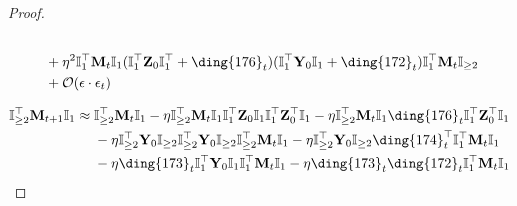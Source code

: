 \documentclass{article}
\theoremstyle{plain}
\theoremstyle{remark}
\def\O{\mathcal{O}}
\def\bY{\mathbf{Y}}
\def\bZ{\mathbf{Z}}
\newcommand{\cc}[1]{\text{\ding{\number\numexpr#1 + 171\relax}}}
\begin{document}
\begin{proof}
\begin{align*}
        \\
        &~~~~
            + \eta^2 \mathbb{I}_{1}^\top\mathbf{M}_{t}\mathbb{I}_{1}
            (\mathbb{I}_{1}^\top\bZ_0\mathbb{I}_1^\top+\cc{5}_t)
            (\mathbb{I}_{1}^\top\bY_0\mathbb{I}_{1}+\cc{1}_t)\mathbb{I}_1^\top\mathbf{M}_{t}\mathbb{I}_{\ge 2}
        \\
        &~~~~
        +\O(\epsilon\cdot\epsilon_t)
    \end{align*}

    \begin{align*}
        \mathbb{I}_{\ge2}^\top\mathbf{M}_{t+1} \mathbb{I}_{1}
        &\approx
            \mathbb{I}_{\ge2}^\top\mathbf{M}_{t}\mathbb{I}_{1}
            - \eta\mathbb{I}_{\ge2}^\top \mathbf{M}_{t}\mathbb{I}_{1}\mathbb{I}_{1}^\top\bZ_0\mathbb{I}_{1}\mathbb{I}_{1}^\top \bZ_0^\top\mathbb{I}_{1} 
            - \eta\mathbb{I}_{\ge2}^\top \mathbf{M}_{t}\mathbb{I}_{1}\cc{5}_t\mathbb{I}_{1}^\top \bZ_0^\top\mathbb{I}_{1} 
        \\
        &~~~~ 
            - \eta \mathbb{I}_{\ge2}^\top \bY_0 \mathbb{I}_{\ge2}\mathbb{I}_{\ge2}^\top \bY_0\mathbb{I}_{\ge 2}\mathbb{I}_{\ge 2}^\top\mathbf{M}_{t} \mathbb{I}_{1}
            - \eta \mathbb{I}_{\ge2}^\top \bY_0 \mathbb{I}_{\ge2}\cc{3}_t^\top\mathbb{I}_{1}^\top\mathbf{M}_{t} \mathbb{I}_{1}
        \\
        &~~~~ 
            -\eta \cc{2}_t \mathbb{I}_{1}^\top\bY_0\mathbb{I}_{1}\mathbb{I}_{1}^\top\mathbf{M}_{t}\mathbb{I}_{1} 
            -\eta \cc{2}_t \cc{1}_t\mathbb{I}_{1}^\top\mathbf{M}_{t}\mathbb{I}_{1} 

\end{align*}
\end{proof}
\end{document}

